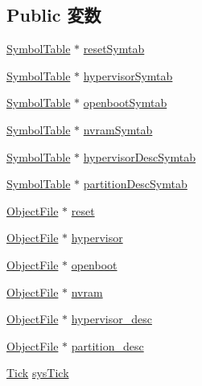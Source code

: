 \subsection*{Public 変数}
\begin{DoxyCompactItemize}
\item 
\hyperlink{classSymbolTable}{SymbolTable} $\ast$ \hyperlink{classSparcSystem_a5f99984fee3a68889273d3f97481cb82}{resetSymtab}
\item 
\hyperlink{classSymbolTable}{SymbolTable} $\ast$ \hyperlink{classSparcSystem_a826eb5d888ca43343c090f926e7c670f}{hypervisorSymtab}
\item 
\hyperlink{classSymbolTable}{SymbolTable} $\ast$ \hyperlink{classSparcSystem_ac6366336078abefc0f3d2b6bd5846f6b}{openbootSymtab}
\item 
\hyperlink{classSymbolTable}{SymbolTable} $\ast$ \hyperlink{classSparcSystem_aacbcabf13bf86bdedc9bf1a46ebf08e1}{nvramSymtab}
\item 
\hyperlink{classSymbolTable}{SymbolTable} $\ast$ \hyperlink{classSparcSystem_abae16aef710e4b7f10e3f922505189e7}{hypervisorDescSymtab}
\item 
\hyperlink{classSymbolTable}{SymbolTable} $\ast$ \hyperlink{classSparcSystem_aa85085e0cb624ffd89646d7101d9d9ec}{partitionDescSymtab}
\item 
\hyperlink{classObjectFile}{ObjectFile} $\ast$ \hyperlink{classSparcSystem_abd507156b4f29b64ca6c1327e3c9aff1}{reset}
\item 
\hyperlink{classObjectFile}{ObjectFile} $\ast$ \hyperlink{classSparcSystem_a693eeebf890fe16aa181edba9fc1c542}{hypervisor}
\item 
\hyperlink{classObjectFile}{ObjectFile} $\ast$ \hyperlink{classSparcSystem_a8c9bace2c61d3c341b5b2ec031d09b9c}{openboot}
\item 
\hyperlink{classObjectFile}{ObjectFile} $\ast$ \hyperlink{classSparcSystem_a2e5918976373473601e9423650ed3df9}{nvram}
\item 
\hyperlink{classObjectFile}{ObjectFile} $\ast$ \hyperlink{classSparcSystem_aa995bbd1ec284b0db88f63ca31ba5ca4}{hypervisor\_\-desc}
\item 
\hyperlink{classObjectFile}{ObjectFile} $\ast$ \hyperlink{classSparcSystem_a4c30c01c5354157df3672b2891888c7a}{partition\_\-desc}
\item 
\hyperlink{base_2types_8hh_a5c8ed81b7d238c9083e1037ba6d61643}{Tick} \hyperlink{classSparcSystem_a91f1052694138b23ec475743589bfb9b}{sysTick}
\end{DoxyCompactItemize}
